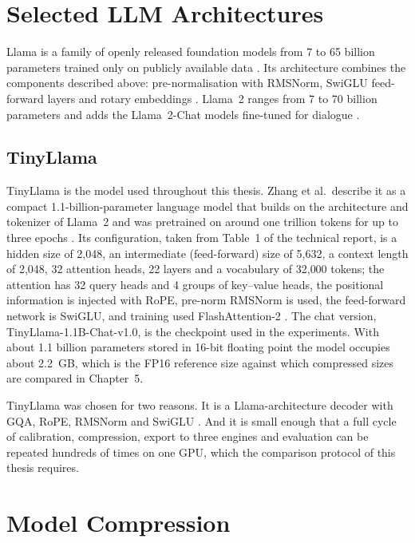 \documentclass[
11pt, %
english, %
singlespacing, %
headsepline, %
]{MastersDoctoralThesis} %
\begin{document}
\section{Selected LLM Architectures}
\label{sec:ch2-archs}

Llama is a family of openly released foundation models from 7 to 65 billion parameters trained only on publicly available data \cite{touvron2023llama}. Its architecture combines the components described above: pre-normalisation with RMSNorm, SwiGLU feed-forward layers and rotary embeddings \cite{touvron2023llama}. Llama~2 ranges from 7 to 70 billion parameters and adds the Llama~2-Chat models fine-tuned for dialogue \cite{touvron2023llama2}.

\subsection{TinyLlama}
\label{sec:ch2-tinyllama}

TinyLlama is the model used throughout this thesis. Zhang et al.\ describe it as a compact 1.1-billion-parameter language model that builds on the architecture and tokenizer of Llama~2 and was pretrained on around one trillion tokens for up to three epochs \cite{zhang2024tinyllama}. Its configuration, taken from Table~1 of the technical report, is a hidden size of 2{,}048, an intermediate (feed-forward) size of 5{,}632, a context length of 2{,}048, 32 attention heads, 22 layers and a vocabulary of 32{,}000 tokens; the attention has 32 query heads and 4 groups of key--value heads, the positional information is injected with RoPE, pre-norm RMSNorm is used, the feed-forward network is SwiGLU, and training used FlashAttention-2 \cite{zhang2024tinyllama}. The chat version, TinyLlama-1.1B-Chat-v1.0, is the checkpoint used in the experiments. With about 1.1 billion parameters stored in 16-bit floating point the model occupies about 2.2~GB, which is the FP16 reference size against which compressed sizes are compared in Chapter~5.

TinyLlama was chosen for two reasons. It is a Llama-architecture decoder with GQA, RoPE, RMSNorm and SwiGLU \cite{zhang2024tinyllama}. And it is small enough that a full cycle of calibration, compression, export to three engines and evaluation can be repeated hundreds of times on one GPU, which the comparison protocol of this thesis requires.

\section{Model Compression}
\label{sec:ch2-compression}
\end{document}
